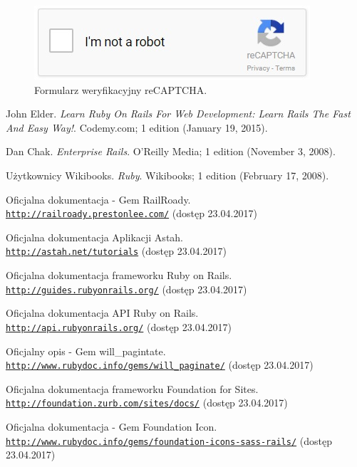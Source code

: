 \documentclass[openright]{xmgr}
\begin{document}
\begin{figure}[!tbh]
\centering
\includegraphics[width=.6\linewidth]{fig/captcha}
\caption{Formularz weryfikacyjny reCAPTCHA.}
\end{figure}

\begin{thebibliography}{9}
John Elder.
\textit{Learn Ruby On Rails For Web Development: Learn Rails The Fast And Easy Way!}. 
Codemy.com; 1 edition (January 19, 2015).
 
Dan Chak.
\textit{Enterprise Rails}. 
O'Reilly Media; 1 edition (November 3, 2008).

Użytkownicy Wikibooks.
\textit{Ruby}. 
Wikibooks; 1 edition (February 17, 2008).

Oficjalna dokumentacja - Gem RailRoady.
\\\texttt{\url{http://railroady.prestonlee.com/}} (dostęp 23.04.2017)

Oficjalna dokumentacja Aplikacji Astah.
\\\texttt{\url{http://astah.net/tutorials}} (dostęp 23.04.2017)

Oficjalna dokumentacja frameworku Ruby on Rails.
\\\texttt{\url{http://guides.rubyonrails.org/}} (dostęp 23.04.2017)

Oficjalna dokumentacja API Ruby on Rails. 
\\\texttt{\url{http://api.rubyonrails.org/}} (dostęp 23.04.2017)

Oficjalny opis - Gem will\_pagintate. 
\\\texttt{\url{http://www.rubydoc.info/gems/will_paginate/}} (dostęp 23.04.2017)

Oficjalna dokumentacja frameworku Foundation for Sites. 
\\\texttt{\url{http://foundation.zurb.com/sites/docs/}} (dostęp 23.04.2017)

Oficjalna dokumentacja - Gem Foundation Icon.
\\\texttt{\url{http://www.rubydoc.info/gems/foundation-icons-sass-rails/}} (dostęp 23.04.2017)


\end{thebibliography}
\end{document}
